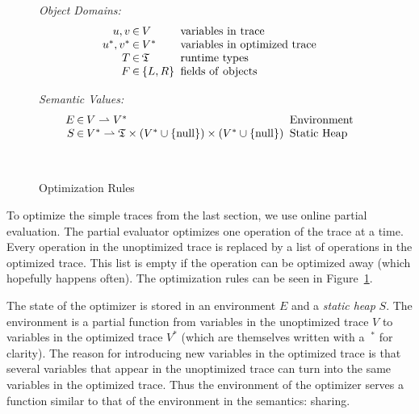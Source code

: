 \documentclass{sigplanconf}
\begin{document}
\begin{figure}
\begin{center}
\begin{minipage}[b]{7 cm}
\emph{Object Domains:}
$$\setlength\arraycolsep{0.1em}
 \begin{array}{rcll}
    u,v & \in & V & \mathrm{\ variables\ in\ trace}\\
    u^*,v^* & \in & V^* & \mathrm{\ variables\ in\ optimized\ trace}\\
    T & \in & \mathfrak{T} & \mathrm{\ runtime\ types}\\
    F & \in & \left\{ L,R\right\} & \mathrm{\ fields\ of\ objects}\\
 \end{array}
$$
\end{minipage}
\begin{minipage}[b]{5 cm}
\emph{Semantic Values:}
$$\setlength\arraycolsep{0.1em}
 \begin{array}{rcll}
    E & \in & V\rightharpoonup V^* & \mathrm{\ Environment}\\
    S & \in & V^*\rightharpoonup\mathfrak{T}\times(V^*\cup \{ \mathrm{null} \})\times (V^*\cup \{ \mathrm{null}\} ) & \mathrm{\ Static\ Heap}\\
    \\
    \\
 \end{array}
$$
\end{minipage}
\end{center}
\caption{Optimization Rules}
\label{fig:optimization}
\end{figure}

To optimize the simple traces from the last section, we use online partial
evaluation. The partial evaluator optimizes one operation of the trace at a
time. Every operation in the unoptimized trace is replaced by a list of
operations in the optimized trace. This list is empty if the operation
can be optimized away (which hopefully happens often). The optimization rules
can be seen in Figure~\ref{fig:optimization}.

The state of the optimizer is stored in an environment $E$ and a \emph{static
heap} $S$. The environment is a partial function from variables in the
unoptimized trace $V$ to variables in the optimized trace $V^*$ (which are
themselves written with a
$\ ^*$ for clarity). The reason for introducing new variables in the optimized
trace is that several variables that appear in the unoptimized trace can turn
into the same variables in the optimized trace. Thus the environment of the
optimizer serves a function similar to that of the environment in the semantics: sharing.
\end{document}
